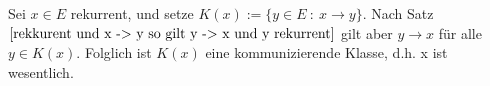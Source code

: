 Sei $x \in E$ rekurrent, und setze $K(x) := \lbrace y \in E \: : \: x \rightarrow y \rbrace$. Nach Satz $\ref{rekkurent und x -> y so gilt y -> x und y rekurrent}$ gilt aber $y \rightarrow x$ für alle $y \in K(x)$. Folglich ist $K(x)$ eine kommunizierende Klasse, d.h. x ist wesentlich.